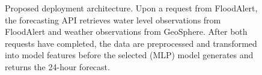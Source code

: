 \begin{figure}[htbp]

  \caption{Proposed deployment architecture. Upon a request from
  FloodAlert, the forecasting API retrieves water level observations from
  FloodAlert and weather observations from GeoSphere.
  After both requests have completed, the data are preprocessed and transformed
  into model features before the selected (\ac{MLP}) model generates and returns the
  24-hour forecast.}

  \label{fig:deployment-architecture}
\end{figure}
